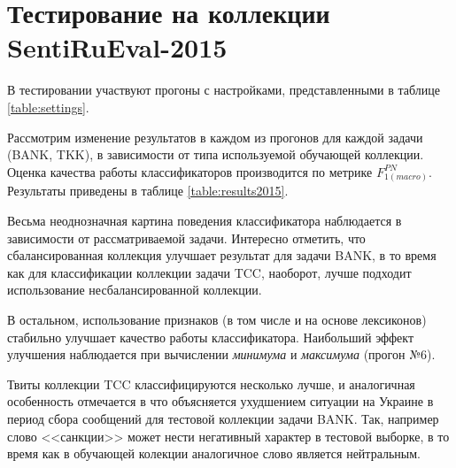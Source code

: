 \section{Тестирование на коллекции SentiRuEval-2015}

В тестировании участвуют прогоны с настройками, представленными в таблице
\ref{table:settings}.



Рассмотрим изменение результатов в каждом из прогонов для каждой задачи
(BANK, TKK), в зависимости от типа используемой обучающей коллекции.
Оценка качества работы классификаторов производится по метрике
$F_{1(macro)}^{PN}$.
Результаты приведены в таблице
\ref{table:results2015}.



Весьма неоднозначная картина поведения классификатора наблюдается в зависимости
от рассматриваемой задачи.
Интересно отметить, что сбалансированная коллекция улучшает результат для
задачи BANK, в то время как для классификации коллекции задачи TCC, наоборот,
лучше подходит использование несбалансированной коллекции.

В остальном, использование признаков (в том числе и на основе лексиконов)
стабильно улучшает качество работы классификатора.
Наибольший эффект улучшения наблюдается при вычислении
{\it минимума } и {\it максимума} (прогон №6).

Твиты коллекции TCC классифицируются несколько лучше, и аналогичная особенность
отмечается в \cite{tonalityAnalysis} что объясняется ухудшением ситуации на
Украине в период сбора сообщений для тестовой коллекции задачи BANK.
Так, например слово <<санкции>> может нести негативный характер в тестовой
выборке, в то время как в обучающей колекции аналогичное слово является
нейтральным.

